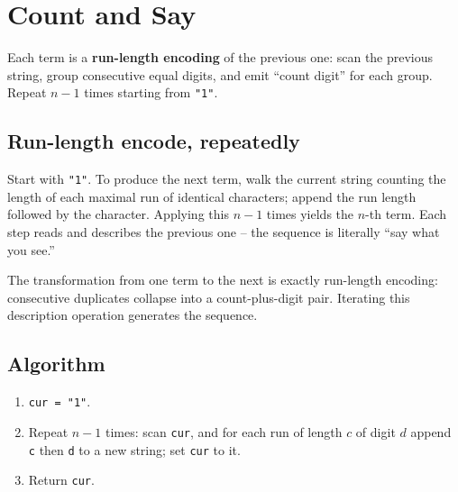 \section{Count and Say}
\label{sec:str-count-and-say}


\begin{patternbox}
Each term is a \textbf{run-length encoding} of the previous one: scan the
previous string, group consecutive equal digits, and emit ``count digit''
for each group. Repeat $n-1$ times starting from \texttt{"1"}.
\end{patternbox}

\subsection*{Run-length encode, repeatedly}

Start with \texttt{"1"}. To produce the next term, walk the current string
counting the length of each maximal run of identical characters; append the
run length followed by the character. Applying this $n-1$ times yields the
$n$-th term. Each step reads and describes the previous one -- the sequence
is literally ``say what you see.''

\begin{ideabox}
The transformation from one term to the next is exactly run-length encoding:
consecutive duplicates collapse into a count-plus-digit pair. Iterating this
description operation generates the sequence.
\end{ideabox}

\subsection*{Algorithm}

\begin{enumerate}
  \item \texttt{cur = "1"}.
  \item Repeat $n-1$ times: scan \texttt{cur}, and for each run of length
        $c$ of digit $d$ append \texttt{c} then \texttt{d} to a new string;
        set \texttt{cur} to it.
  \item Return \texttt{cur}.
\end{enumerate}

